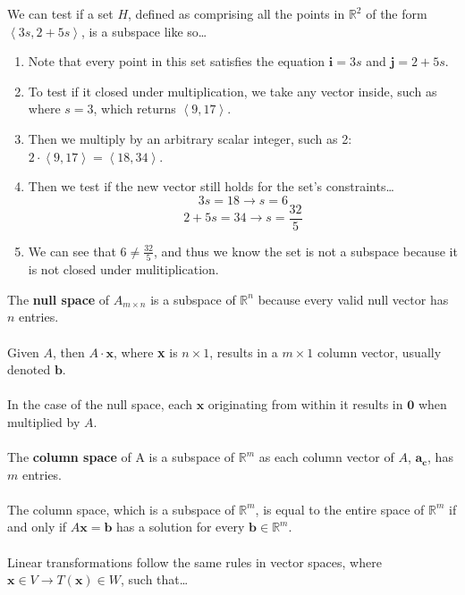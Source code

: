 \documentclass[12pt]{article}
\newcommand{\R}{\mathbb{R}}
\newcommand{\bt}[1]{\textbf{{#1}}}
\newcommand{\bm}[1]{\mathbf{{#1}}}
\newcommand{\vecbrac}[1]{\left\langle{#1}\right\rangle}
\begin{document}
We can test if a set $H$, defined as comprising all the points in $\R^2$ of the form $\vecbrac{3s, 2 + 5s}$, is a subspace like so\dots

\begin{enumerate}
    \item Note that every point in this set satisfies the equation $\bm{i} = 3s$ and $\bm{j} = 2 + 5s$.
    \item To test if it closed under multiplication, we take any vector inside, such as where $s = 3$, which returns $\vecbrac{9,17}$.
    \item Then we multiply by an arbitrary scalar integer, such as 2: $2\cdot\vecbrac{9,17} = \vecbrac{18, 34}$.
    \item Then we test if the new vector still holds for the set's constraints\dots
    $$3s = 18 \rightarrow s = 6$$
    $$2 + 5s = 34 \rightarrow s = \frac{32}{5}$$
    \item We can see that $6 \neq \frac{32}{5}$, and thus we know the set is not a subspace because it is not closed under mulitiplication.
\end{enumerate}

The \bt{null space} of $A_{m \times n}$ is a subspace of $\R^n$ because every valid null vector has $n$ entries. \\ \\

Given $A$, then $A \cdot \bm{x}$, where \bt{x} is $n \times 1$, results in a $m \times 1$ column vector, usually denoted $\bm{b}$. \\ \\

In the case of the null space, each $\bm{x}$ originating from within it results in $\bm{0}$ when multiplied by $A$. \\ \\

The \bt{column space} of A is a subspace of $\R^m$ as each column vector of $A$, $\bm{a_c}$, has $m$ entries. \\ \\

The column space, which is a subspace of $\R^m$, is equal to the entire space of $\R^m$ if and only if $A\bm{x}=\bm{b}$ has a solution
for every $\bm{b} \in \R^m$. \\ \\

Linear transformations follow the same rules in vector spaces, where $\bm{x} \in V \rightarrow T(\bm{x}) \in W$, such that\dots
\end{document}
